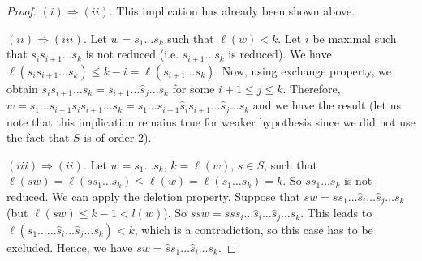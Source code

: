 \documentclass[envcountsame,envcountchap]{svmono}
\begin{document}
\begin{proof}
$(i) \Rightarrow (ii)$. This implication has already been shown above. 

$(ii) \Rightarrow (iii)$. Let $w= s_1 \ldots s_k$ such that $\ell(w) < k$. Let $i$ be maximal such that $s_i s_{i+1} \ldots s_k$ is not reduced (i.e. $s_{i+1} \ldots s_k$ is reduced). We have $\ell (s_i s_{i+1} \ldots s_k) \le k- i = \ell (s_{i+1} \ldots s_k)$. Now, using exchange property, we obtain $s_i s_{i+1} \ldots s_k = s_{i+1} \ldots \hat{s}_j \ldots s_k$ for some $i+1 \le j \le k$. Therefore, $w = s_1 \ldots s_{i-1} s_i s_{i+1} \ldots s_k = s_1 \ldots s_{i-1} \hat{s}_i s_{i+1} \ldots \hat{s}_j \ldots s_k$ and we have the result (let us note that this implication remains true for weaker hypothesis since we did not use the fact that $S$ is of order $2$).  

$(iii) \Rightarrow (ii)$. Let $w= s_1 \ldots s_k$, $k = \ell (w)$, $s\in S$, such that $\ell (s w) = \ell (s s_1 \ldots s_k) \le \ell (w) = \ell (s_1 \ldots s_k ) = k$. So $s s_1 \ldots s_k$ is not reduced. We can apply the deletion property. Suppose that $s w = s s_1 \ldots \hat{s}_i \ldots \hat{s}_j \ldots s_k $ (but $\ell (sw) \le k-1 < l(w)$). So $s s w = s s s_i \ldots \hat{s}_i \ldots {\hat{s}_j} \ldots s_k$. This leads to $\ell (s_1 \ldots ... \hat{s}_i \ldots \hat{s}_j \ldots s_k ) < k$, which is a contradiction, so this case has to be excluded. Hence, we have $s w = \hat{s} s_1 \ldots \hat{s}_i  \ldots s_k $. 


\end{proof}
\end{document}
